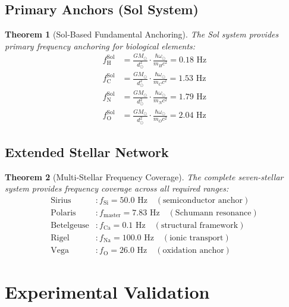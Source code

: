 \documentclass[12pt]{article}
\newtheorem{theorem}{Theorem}
\newcommand{\stellar}[1]{\text{#1}}
\begin{document}
\subsection{Primary Anchors (Sol System)}

\begin{theorem}[Sol-Based Fundamental Anchoring]
The Sol system provides primary frequency anchoring for biological elements:
\begin{align}
f_{\text{H}}^{\stellar{Sol}} &= \frac{G M_{\odot}}{d_{\odot}^2} \cdot \frac{\hbar \omega_{\odot}}{m_H c^2} = 0.18 \text{ Hz} \\
f_{\text{C}}^{\stellar{Sol}} &= \frac{G M_{\odot}}{d_{\odot}^2} \cdot \frac{\hbar \omega_{\odot}}{m_C c^2} = 1.53 \text{ Hz} \\
f_{\text{N}}^{\stellar{Sol}} &= \frac{G M_{\odot}}{d_{\odot}^2} \cdot \frac{\hbar \omega_{\odot}}{m_N c^2} = 1.79 \text{ Hz} \\
f_{\text{O}}^{\stellar{Sol}} &= \frac{G M_{\odot}}{d_{\odot}^2} \cdot \frac{\hbar \omega_{\odot}}{m_O c^2} = 2.04 \text{ Hz}
\end{align}
\end{theorem}

\subsection{Extended Stellar Network}

\begin{theorem}[Multi-Stellar Frequency Coverage]
The complete seven-stellar system provides frequency coverage across all required ranges:
\begin{align}
\stellar{Sirius} &: f_{\text{Si}} = 50.0 \text{ Hz} \quad (\text{semiconductor anchor}) \\
\stellar{Polaris} &: f_{\text{master}} = 7.83 \text{ Hz} \quad (\text{Schumann resonance}) \\
\stellar{Betelgeuse} &: f_{\text{Ca}} = 0.1 \text{ Hz} \quad (\text{structural framework}) \\
\stellar{Rigel} &: f_{\text{Na}} = 100.0 \text{ Hz} \quad (\text{ionic transport}) \\
\stellar{Vega} &: f_{\text{O}} = 26.0 \text{ Hz} \quad (\text{oxidation anchor})
\end{align}
\end{theorem}

\section{Experimental Validation}
\end{document}
